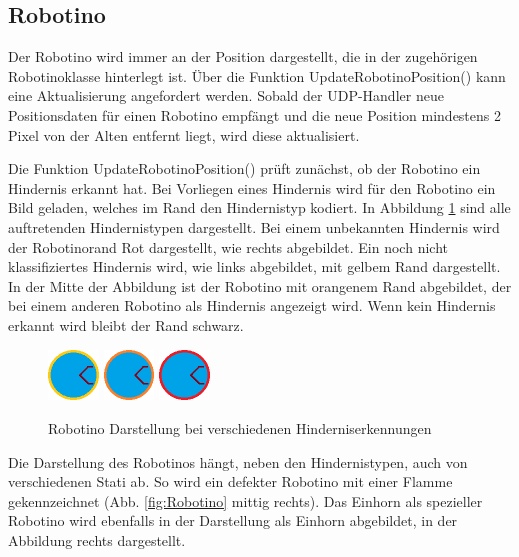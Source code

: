 \subsection{Robotino}

Der Robotino wird immer an der Position dargestellt, die in der zugehörigen Robotinoklasse hinterlegt ist. Über die Funktion UpdateRobotinoPosition() kann eine Aktualisierung angefordert werden. Sobald der UDP-Handler neue Positionsdaten für einen Robotino empfängt und die neue Position mindestens 2 Pixel von der Alten entfernt liegt, wird diese aktualisiert. 

Die Funktion UpdateRobotinoPosition() prüft zunächst, ob der Robotino ein Hindernis erkannt hat. Bei Vorliegen eines Hindernis wird für den Robotino ein Bild geladen, welches im Rand den Hindernistyp kodiert. In Abbildung \ref{fig:RobotinoHindernis} sind alle auftretenden Hindernistypen dargestellt. Bei einem unbekannten Hindernis wird der Robotinorand Rot dargestellt, wie rechts abgebildet. Ein noch nicht klassifiziertes Hindernis wird, wie links abgebildet, mit gelbem Rand dargestellt. In der Mitte der Abbildung ist der Robotino mit orangenem Rand abgebildet, der bei einem anderen Robotino als Hindernis angezeigt wird.
Wenn kein Hindernis erkannt wird bleibt der Rand schwarz. 

\begin{figure}[htb]
    \centering
    \includegraphics[width=0.12\textwidth]{Abbildungen/RobotinoGoffenRandGelb.png}
    \includegraphics[width=0.12\textwidth]{Abbildungen/RobotinoGoffenRandOrange.png}
    \includegraphics[width=0.12\textwidth]{Abbildungen/RobotinoGoffenRandRot.png}
    \caption{Robotino Darstellung bei verschiedenen Hinderniserkennungen}		
    \label{fig:RobotinoHindernis}
\end{figure}

Die Darstellung des Robotinos hängt, neben den Hindernistypen, auch von verschiedenen Stati ab. So wird ein defekter Robotino mit einer Flamme gekennzeichnet (Abb. \ref{fig:Robotino} mittig rechts). Das Einhorn als spezieller Robotino wird ebenfalls in der Darstellung als Einhorn abgebildet, in der Abbildung rechts dargestellt. 

